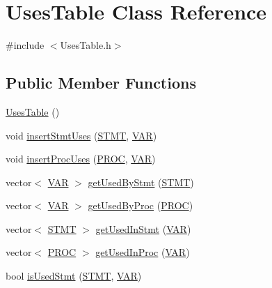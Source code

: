 \hypertarget{class_uses_table}{\section{Uses\-Table Class Reference}
\label{class_uses_table}
}


{\ttfamily \#include $<$Uses\-Table.\-h$>$}

\subsection*{Public Member Functions}
\begin{DoxyCompactItemize}
\item 
\hyperlink{class_uses_table_a22b7102c56cfa8e9fa4d806c3ad4c586}{Uses\-Table} ()
\item 
void \hyperlink{class_uses_table_ae29b8e5db64f12f6966916c62d4f911b}{insert\-Stmt\-Uses} (\hyperlink{std_afx_8h_a4a876b28ac3f59cecb39c2d2d76e4e7a}{S\-T\-M\-T}, \hyperlink{std_afx_8h_a3112e3faf0465bb5d85272a347b7f2f1}{V\-A\-R})
\item 
void \hyperlink{class_uses_table_a6d7e75d504e79223fa6f9676fb81963a}{insert\-Proc\-Uses} (\hyperlink{std_afx_8h_aa07ea1d188c7b45668f1bd82ffd6d87e}{P\-R\-O\-C}, \hyperlink{std_afx_8h_a3112e3faf0465bb5d85272a347b7f2f1}{V\-A\-R})
\item 
vector$<$ \hyperlink{std_afx_8h_a3112e3faf0465bb5d85272a347b7f2f1}{V\-A\-R} $>$ \hyperlink{class_uses_table_ae6da24dd1e776a415bb74255635b1731}{get\-Used\-By\-Stmt} (\hyperlink{std_afx_8h_a4a876b28ac3f59cecb39c2d2d76e4e7a}{S\-T\-M\-T})
\item 
vector$<$ \hyperlink{std_afx_8h_a3112e3faf0465bb5d85272a347b7f2f1}{V\-A\-R} $>$ \hyperlink{class_uses_table_a606a8c1dc8c9cc3b783e765c09e6891a}{get\-Used\-By\-Proc} (\hyperlink{std_afx_8h_aa07ea1d188c7b45668f1bd82ffd6d87e}{P\-R\-O\-C})
\item 
vector$<$ \hyperlink{std_afx_8h_a4a876b28ac3f59cecb39c2d2d76e4e7a}{S\-T\-M\-T} $>$ \hyperlink{class_uses_table_ae9bc0a7a3183df114286107f0ad72b8b}{get\-Used\-In\-Stmt} (\hyperlink{std_afx_8h_a3112e3faf0465bb5d85272a347b7f2f1}{V\-A\-R})
\item 
vector$<$ \hyperlink{std_afx_8h_aa07ea1d188c7b45668f1bd82ffd6d87e}{P\-R\-O\-C} $>$ \hyperlink{class_uses_table_aaedcc22a6cb307cb6c851e7c64815371}{get\-Used\-In\-Proc} (\hyperlink{std_afx_8h_a3112e3faf0465bb5d85272a347b7f2f1}{V\-A\-R})
\item 
bool \hyperlink{class_uses_table_a0efe799acfbeea3b597258408896ca12}{is\-Used\-Stmt} (\hyperlink{std_afx_8h_a4a876b28ac3f59cecb39c2d2d76e4e7a}{S\-T\-M\-T}, \hyperlink{std_afx_8h_a3112e3faf0465bb5d85272a347b7f2f1}{V\-A\-R})

\end{DoxyCompactItemize}
